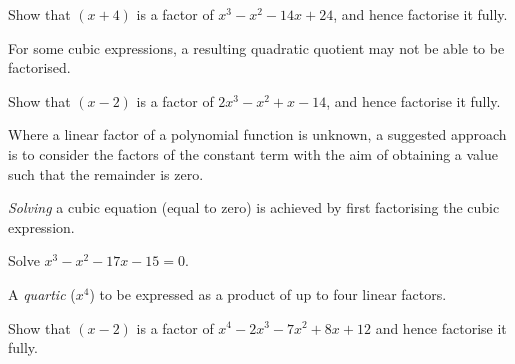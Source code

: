 \documentclass[
  11pt,
  openany]{book}
\begin{document}
\vspace{-0.3cm}

\begin{tcolorbox}[title=Example,colback=PineGreen!2, colframe=PineGreen]

Show that $(x+4)$ is a factor of $x^3-x^2-14x+24$, and hence factorise it fully.

\tcblower

\vspace{5cm}

\end{tcolorbox}

For some cubic expressions, a resulting quadratic quotient may not be able to be factorised.

\begin{tcolorbox}[title=Example,colback=PineGreen!2, colframe=PineGreen]

Show that $(x-2)$ is a factor of $2x^3-x^2+x-14$, and hence factorise it fully.

\tcblower

\vspace{5cm}

\end{tcolorbox}

\pagebreak

Where a linear factor of a polynomial function is unknown, a suggested approach is to consider the factors of the constant term with the aim of obtaining a value such that the remainder is zero.

\emph{Solving} a cubic equation (equal to zero) is achieved by first factorising the cubic expression.

\begin{tcolorbox}[title=Example,colback=PineGreen!2, colframe=PineGreen]

Solve $x^3-x^2-17x-15=0$.

\tcblower

\vspace{8cm}

\end{tcolorbox}

A \textit{quartic} (\(x^4\)) to be expressed as a product of up to four linear factors.

\begin{tcolorbox}[title=Example,colback=PineGreen!2, colframe=PineGreen]

Show that $(x-2)$ is a factor of $x^4-2x^3-7x^2+8x+12$ and hence factorise it fully.

\tcblower

\vspace{9cm}

\end{tcolorbox}
\end{document}

